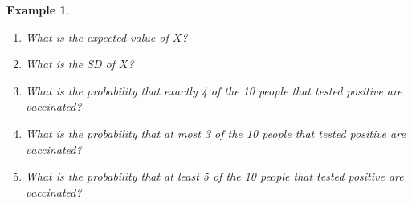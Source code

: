\documentclass[12pt]{amsart}
\newtheorem{example}[theorem]{Example}
\begin{document}
{\begin{example}
\begin{enumerate}


\item What is the expected value of $X$?

\vspace{4cm}

\item What is the SD of $X$?

\vspace{4cm}
%




\item What is the probability that exactly 4 of the 10 people that tested positive are vaccinated?



\newpage

\item What is the probability that at most 3 of the 10 people that tested positive are vaccinated?

%

\vspace{9cm}


\item What is the probability that at least 5 of the 10 people that tested positive are vaccinated?

%




\end{enumerate}
\end{example}}
\end{document}
